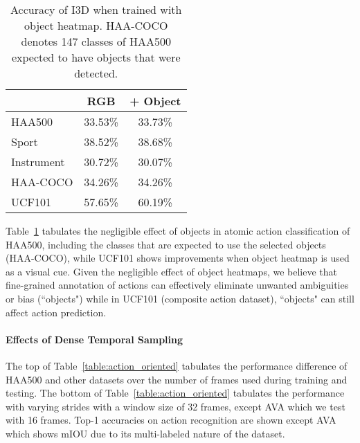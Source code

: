 \documentclass[10pt,twocolumn,letterpaper]{article}
\begin{document}
\begin{table}[t]
    {\small 
    \begin{center}
        \begin{tabular}{ l |c |c  }
        \hline
             & RGB & + Object\\
         \hline
            HAA500            & 33.53\% & 33.73\%  \\
            \:\:  Sport       & 38.52\% & 38.68\%  \\
            \:\:  Instrument  & 30.72\% & 30.07\%  \\
            \:\:  HAA-COCO    & 34.26\% & 34.26\%  \\
        \hline
            UCF101            & 57.65\% & 60.19\%   \\
        \hline
        \end{tabular}
    \end{center}}
    \vspace{-0.1in}
    \caption{Accuracy of I3D when trained with object heatmap. HAA-COCO denotes 147 classes of HAA500 expected to have objects that were detected.}
    \vspace{-0.1in}
    \label{table:object_detection}
\end{table}

Table~\ref{table:object_detection} tabulates the negligible effect of objects in atomic action classification of HAA500, including the classes that are expected to use the selected objects (HAA-COCO), while UCF101 shows improvements when object heatmap is used as a visual cue. 
Given the negligible effect of object heatmaps, 
we believe that fine-grained annotation of actions can effectively eliminate unwanted ambiguities or bias (``objects") while in UCF101 (composite action dataset), ``objects" can still affect  action prediction.

\vspace{-1.2em}
\paragraph{Effects of Dense Temporal Sampling}

The top of Table~\ref{table:action_oriented} tabulates the performance difference of HAA500 and other datasets over the number of frames used during training and testing. The bottom of Table~\ref{table:action_oriented} tabulates the performance with varying strides with a window size of 32 frames, except AVA which we test with 16 frames. Top-1 accuracies on action recognition are shown except AVA which shows mIOU due to its multi-labeled nature of the dataset. 
\end{document}
